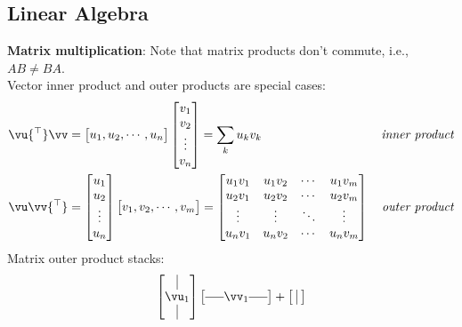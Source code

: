 \documentclass[a4paper,11pt]{exam}
\newcounter{ct}
\newcommand{\horzbar}{\rule[.5ex]{1.5em}{0.4pt}}
\newcommand{\trp}{{^\top}} %
\begin{document}
\begin{questions}
\section{Linear Algebra}
\begin{tcolorbox}[colback=black!1!,title=Matrix Fun Facts]
\textbf{Matrix multiplication}:
\noindent
Note that matrix products don't commute, i.e., $AB \neq BA$.\\[1mm]
Vector inner product and outer products are special cases:
\begin{align}
    \vu\trp \vv &=
    \begin{bmatrix}
	u_1, u_2, \cdots, u_n
    \end{bmatrix}
    \begin{bmatrix}
	v_1\\v_2\\\vdots\\ v_n
    \end{bmatrix}
    =
    \sum_k u_k v_k
    \,&
    \text{\emph{inner product}}
    \\
    \vu \vv\trp &=
    \begin{bmatrix}
	u_1\\u_2\\\vdots\\ u_n
    \end{bmatrix}
    \begin{bmatrix}
	v_1, v_2, \cdots, v_m
    \end{bmatrix}
    =
    \begin{bmatrix}
	u_1 v_1 & u_1 v_2 & \cdots & u_1 v_m
	\\
	u_2 v_1 & u_2 v_2 & \cdots & u_2 v_m
	\\
	\vdots & \vdots & \ddots & \vdots
	\\
	u_n v_1 & u_n v_2 & \cdots & u_n v_m
    \end{bmatrix}
    \,&
    \text{\emph{outer product}}
\end{align}
Matrix outer product stacks:
\begin{align}
    \begin{bmatrix}
	\kern.3em\vline\kern.3em \\
	\vu_1 \\
	\kern.3em\vline\kern.3em
    \end{bmatrix}
    \begin{bmatrix}
	\horzbar \vv_1 \horzbar
    \end{bmatrix}
    +
    \begin{bmatrix}
	\kern.3em\vline\kern.3em \\

\end{bmatrix}
\end{align}
\end{tcolorbox}
\end{questions}
\end{document}
